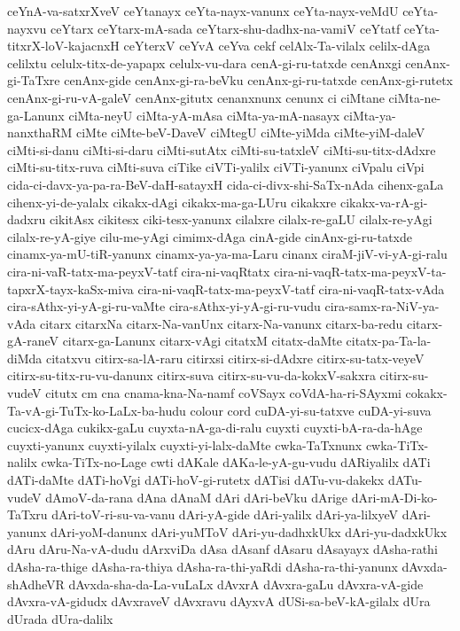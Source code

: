 {ceYnA-va-satxrXveV
ceYtanayx
ceYta-nayx-vanunx
ceYta-nayx-veMdU
ceYta-nayxvu
ceYtarx
ceYtarx-mA-sada
ceYtarx-shu-dadhx-na-vamiV
ceYtatf
ceYta-titxrX-loV-kajacnxH
ceYterxV
ceYvA
ceYva
cekf
celAlx-Ta-vilalx
celilx-dAga
celilxtu
celulx-titx-de-yapapx
celulx-vu-dara
cenA-gi-ru-tatxde
cenAnxgi
cenAnx-gi-TaTxre
cenAnx-gide
cenAnx-gi-ra-beVku
cenAnx-gi-ru-tatxde
cenAnx-gi-rutetx
cenAnx-gi-ru-vA-galeV
cenAnx-gitutx
cenanxnunx
cenunx
ci
ciMtane
ciMta-ne-ga-Lanunx
ciMta-neyU
ciMta-yA-mAsa
ciMta-ya-mA-nasayx
ciMta-ya-nanxthaRM
ciMte
ciMte-beV-DaveV
ciMtegU
ciMte-yiMda
ciMte-yiM-daleV
ciMti-si-danu
ciMti-si-daru
ciMti-sutAtx
ciMti-su-tatxleV
ciMti-su-titx-dAdxre
ciMti-su-titx-ruva
ciMti-suva
ciTike
ciVTi-yalilx
ciVTi-yanunx
ciVpalu
ciVpi
cida-ci-davx-ya-pa-ra-BeV-daH-satayxH
cida-ci-divx-shi-SaTx-nAda
cihenx-gaLa
cihenx-yi-de-yalalx
cikakx-dAgi
cikakx-ma-ga-LUru
cikakxre
cikakx-va-rA-gi-dadxru
cikitAsx
cikitesx
ciki-tesx-yanunx
cilalxre
cilalx-re-gaLU
cilalx-re-yAgi
cilalx-re-yA-giye
cilu-me-yAgi
cimimx-dAga
cinA-gide
cinAnx-gi-ru-tatxde
cinamx-ya-mU-tiR-yanunx
cinamx-ya-ya-ma-Laru
cinanx
ciraM-jiV-vi-yA-gi-ralu
cira-ni-vaR-tatx-ma-peyxV-tatf
cira-ni-vaqRtatx
cira-ni-vaqR-tatx-ma-peyxV-ta-tapxrX-tayx-kaSx-miva
cira-ni-vaqR-tatx-ma-peyxV-tatf
cira-ni-vaqR-tatx-vAda
cira-sAthx-yi-yA-gi-ru-vaMte
cira-sAthx-yi-yA-gi-ru-vudu
cira-samx-ra-NiV-ya-vAda
citarx
citarxNa
citarx-Na-vanUnx
citarx-Na-vanunx
citarx-ba-redu
citarx-gA-raneV
citarx-ga-Lanunx
citarx-vAgi
citatxM
citatx-daMte
citatx-pa-Ta-la-diMda
citatxvu
citirx-sa-lA-raru
citirxsi
citirx-si-dAdxre
citirx-su-tatx-veyeV
citirx-su-titx-ru-vu-danunx
citirx-suva
citirx-su-vu-da-kokxV-sakxra
citirx-su-vudeV
citutx
cm
cna
cnama-kna-Na-namf
coVSayx
coVdA-ha-ri-SAyxmi
cokakx-Ta-vA-gi-TuTx-ko-LaLx-ba-hudu
colour
cord
cuDA-yi-su-tatxve
cuDA-yi-suva
cucicx-dAga
cukikx-gaLu
cuyxta-nA-ga-di-ralu
cuyxti
cuyxti-bA-ra-da-hAge
cuyxti-yanunx
cuyxti-yilalx
cuyxti-yi-lalx-daMte
cwka-TaTxnunx
cwka-TiTx-nalilx
cwka-TiTx-no-Lage
cwti
dAKale
dAKa-le-yA-gu-vudu
dARiyalilx
dATi
dATi-daMte
dATi-hoVgi
dATi-hoV-gi-rutetx
dATisi
dATu-vu-dakekx
dATu-vudeV
dAmoV-da-rana
dAna
dAnaM
dAri
dAri-beVku
dArige
dAri-mA-Di-ko-TaTxru
dAri-toV-ri-su-va-vanu
dAri-yA-gide
dAri-yalilx
dAri-ya-lilxyeV
dAri-yanunx
dAri-yoM-danunx
dAri-yuMToV
dAri-yu-dadhxkUkx
dAri-yu-dadxkUkx
dAru
dAru-Na-vA-dudu
dArxviDa
dAsa
dAsanf
dAsaru
dAsayayx
dAsha-rathi
dAsha-ra-thige
dAsha-ra-thiya
dAsha-ra-thi-yaRdi
dAsha-ra-thi-yanunx
dAvxda-shAdheVR
dAvxda-sha-da-La-vuLaLx
dAvxrA
dAvxra-gaLu
dAvxra-vA-gide
dAvxra-vA-gidudx
dAvxraveV
dAvxravu
dAyxvA
dUSi-sa-beV-kA-gilalx
dUra
dUrada
dUra-dalilx
}
